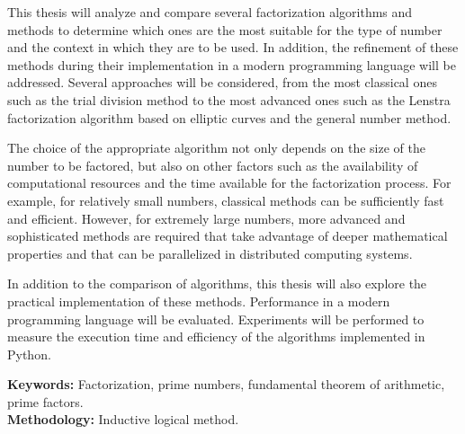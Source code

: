 This thesis will analyze and compare several factorization algorithms and methods to determine which ones are the most suitable for the type of number and the context in which they are to be used. In addition, the refinement of these methods during their implementation in a modern programming language will be addressed. Several approaches will be considered, from the most classical ones such as the trial division method to the most advanced ones such as the Lenstra factorization algorithm based on elliptic curves and the general number method.

The choice of the appropriate algorithm not only depends on the size of the number to be factored, but also on other factors such as the availability of computational resources and the time available for the factorization process. For example, for relatively small numbers, classical methods can be sufficiently fast and efficient. However, for extremely large numbers, more advanced and sophisticated methods are required that take advantage of deeper mathematical properties and that can be parallelized in distributed computing systems.

In addition to the comparison of algorithms, this thesis will also explore the practical implementation of these methods. Performance in a modern programming language will be evaluated. Experiments will be performed to measure the execution time and efficiency of the algorithms implemented in Python.


\textbf{Keywords:} Factorization, prime numbers, fundamental theorem of arithmetic, prime factors.\\
\textbf{Methodology:} Inductive logical method.
